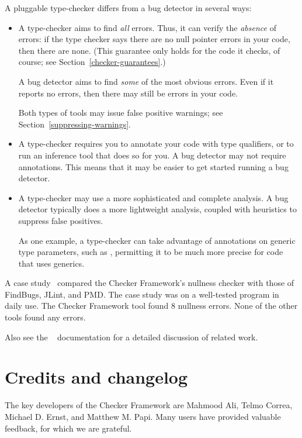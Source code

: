A pluggable type-checker
differs from a bug detector in several ways:
\begin{itemize}
\item
  A type-checker aims to find \emph{all} errors.  Thus, it can verify the
  \emph{absence} of errors:  if the type checker says there are no null
  pointer errors in your code, then there are none.  (This guarantee only
  holds for the code it checks, of course; see
  Section~\ref{checker-guarantees}.)

  A bug detector aims to find \emph{some} of the most obvious errors.  Even
  if it reports no errors, then there may still be errors in your code.

  Both types of tools may issue false positive warnings; see
  Section~\ref{suppressing-warnings}.

\item
  A type-checker requires you to annotate your code with type qualifiers,
  or to run an inference tool that does so for you.  A bug detector may not
  require annotations.  This means that it may be easier to get started
  running a bug detector.

\item
  A type-checker may use a more sophisticated and complete analysis.
  A bug detector typically does a more lightweight analysis, coupled with
  heuristics to suppress false positives.

  As one example, a type-checker can take advantage of annotations on
  generic type parameters, such as , permitting
  it to be much more precise for code that uses generics.

\end{itemize}

A case study~\cite[\S6]{PapiACPE2008} compared the Checker Framework's nullness
checker with those of FindBugs, JLint, and PMD\@.  The case study was on a
well-tested program in daily use.  The Checker Framework tool found 8
nullness errors.  None of the other tools found any errors.

Also see the
~\cite{jsr308}
documentation for a detailed discussion of related work.



\section{Credits and changelog\label{credits}}

The key developers of the Checker Framework are Mahmood Ali, Telmo Correa,
Michael D. Ernst, and Matthew M. Papi.
Many users have provided valuable feedback, for which we are grateful.

